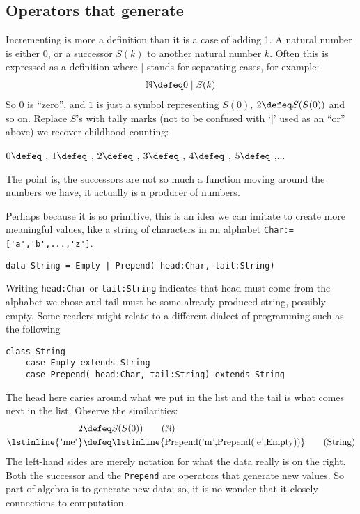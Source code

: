 \subsection{Operators that generate}
Incrementing is more a definition than it is a 
 case of adding 1.
A natural number is either $0$, or a successor 
$S(k)$ to 
another natural number $k$.  Often this is expressed as a 
definition where $\mid$ stands for separating cases, 
for example:
\begin{align*}
    \mathbb{N} \defeq 0 \mid S(k)
\end{align*}
So $0$ is ``zero'', and $1$ is just a symbol representing $S(0)$, 
$2\defeq S(S(0))$ and so on.  Replace $S$'s with tally marks (not to be 
confused with `$|$' used as an ``or'' above)
we recover childhood counting:
\begin{center}
    $0\defeq$ \underline{\hspace{5mm}}, 
    $1\defeq$ \StrokeOne,
    $2\defeq$ \StrokeTwo,
    $3\defeq$ \StrokeThree,
    $4\defeq$ \StrokeFour,
    $5\defeq$ \StrokeFive,...
\end{center}
The point is, the successors are not so much a function 
moving around the numbers we have, it actually is a producer 
of numbers. 

Perhaps because it is so primitive, this is an idea we 
can imitate to create more meaningful values, like a string 
of characters in an alphabet \lstinline{Char:=['a','b',...,'z']}.
\begin{lstlisting}[language=Hidris]
data String = Empty | Prepend( head:Char, tail:String) 
\end{lstlisting}
Writing \lstinline{head:Char} or \lstinline{tail:String} 
indicates that head must come from the alphabet we chose 
and tail must be some already produced string, possibly empty.
Some readers might relate to a different dialect of 
programming such as the following
\begin{lstlisting}[language=Sava]
class String
    case Empty extends String
    case Prepend( head:Char, tail:String) extends String
\end{lstlisting}
The head here caries around what we put in the list and the tail 
is what comes next in the list.  Observe the similarities:
\begin{align}
     2 & \defeq S(S(0)) \tag{$\mathbb{N}$}\\
 \text{\lstinline{"me"}} & \defeq \text{\lstinline{Prepend('m',Prepend('e',Empty))}}
\tag{String}
\end{align}
The left-hand sides are merely notation for what the data really is on the right.
Both the successor and the \lstinline{Prepend} are operators that generate 
new values.  So part of algebra is to generate new data; so, it is no wonder 
that it closely connections to computation.

